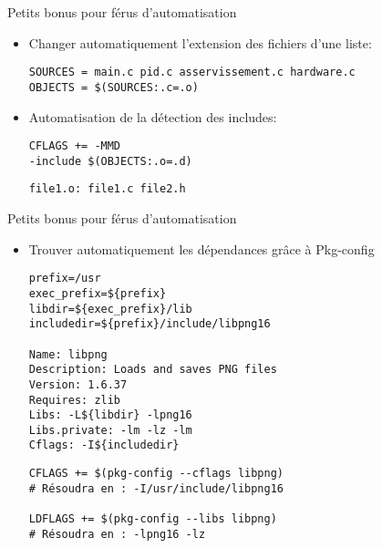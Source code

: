 \begin{frame}[fragile]{Petits bonus pour férus d'automatisation}
\begin{itemize}
\item Changer automatiquement l'extension des fichiers d'une liste:
\begin{lstlisting}
SOURCES = main.c pid.c asservissement.c hardware.c
OBJECTS = $(SOURCES:.c=.o)
\end{lstlisting}

\item Automatisation de la détection des includes:
\begin{lstlisting}[title=Makefile]
CFLAGS += -MMD
-include $(OBJECTS:.o=.d)
\end{lstlisting}
\medskip
\begin{lstlisting}[title=file1.d]
file1.o: file1.c file2.h

\end{lstlisting}
\end{itemize}
\end{frame}

\begin{frame}[fragile]{Petits bonus pour férus d'automatisation}
\begin{itemize}
\item Trouver automatiquement les dépendances grâce à Pkg-config
\begin{lstlisting}[title=\texttt{/usr/lib/pkgconfig/libpng.pc}]
prefix=/usr
exec_prefix=${prefix}
libdir=${exec_prefix}/lib
includedir=${prefix}/include/libpng16

Name: libpng
Description: Loads and saves PNG files
Version: 1.6.37
Requires: zlib
Libs: -L${libdir} -lpng16
Libs.private: -lm -lz -lm 
Cflags: -I${includedir}
\end{lstlisting}

\begin{lstlisting}[title=Code du makefile]
CFLAGS += $(pkg-config --cflags libpng)
# Résoudra en : -I/usr/include/libpng16

LDFLAGS += $(pkg-config --libs libpng)
# Résoudra en : -lpng16 -lz
\end{lstlisting}
\end{itemize}
\end{frame}

